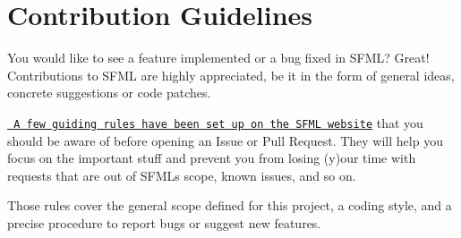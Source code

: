\chapter{Contribution Guidelines}
\hypertarget{md_build_2__deps_2sfml-src_2CONTRIBUTING}{}\label{md_build_2__deps_2sfml-src_2CONTRIBUTING}
\label{md_build_2__deps_2sfml-src_2CONTRIBUTING_autotoc_md711}%
%


You would like to see a feature implemented or a bug fixed in SFML? Great! Contributions to SFML are highly appreciated, be it in the form of general ideas, concrete suggestions or code patches.

\href{https://www.sfml-dev.org/contribute.php}{\texttt{ A few guiding rules have been set up on the SFML website}} that you should be aware of before opening an Issue or Pull Request. They will help you focus on the important stuff and prevent you from losing (y)our time with requests that are out of SFML\textquotesingle{}s scope, known issues, and so on.

Those rules cover the general scope defined for this project, a coding style, and a precise procedure to report bugs or suggest new features. 